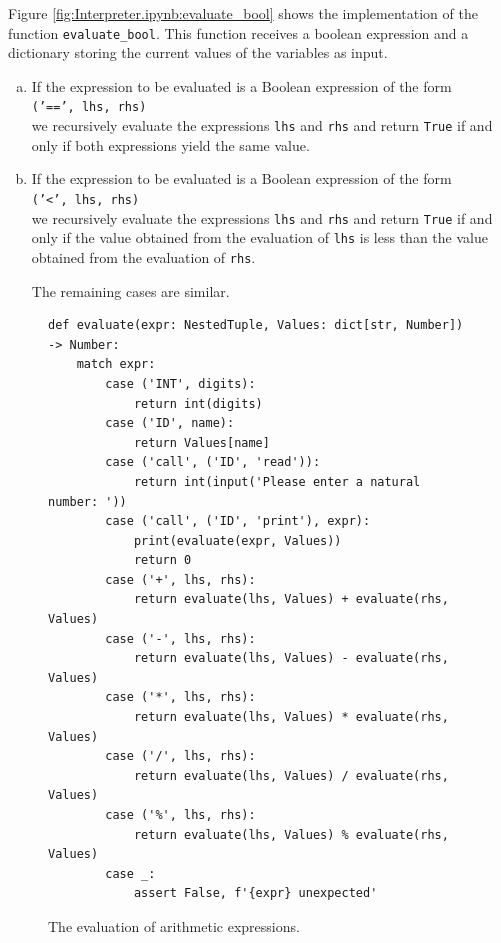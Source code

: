 Figure \ref{fig:Interpreter.ipynb:evaluate_bool} shows the implementation of the function \texttt{evaluate\_bool}.
This function receives a boolean expression and a dictionary storing the current values of the variables as input.
\begin{enumerate}[(a)]
\item If the expression to be evaluated is a Boolean expression of the form
      \\[0.2cm]
      \hspace*{1.3cm}
      \texttt{('==', lhs, rhs)}
      \\[0.2cm]
      we recursively evaluate the expressions \texttt{lhs} and \texttt{rhs} and return \texttt{True} if and only if
      both expressions yield the same value.
\item If the expression to be evaluated is a Boolean expression of the form
      \\[0.2cm]
      \hspace*{1.3cm}
      \texttt{('<', lhs, rhs)}
      \\[0.2cm]
      we recursively evaluate the expressions \texttt{lhs} and \texttt{rhs} and return \texttt{True} if and only if
      the value obtained from the evaluation of \texttt{lhs} is less than the
      value obtained from the evaluation of \texttt{rhs}.

      The remaining cases are similar.
\end{enumerate}

\begin{figure}[!ht]
\centering
\begin{verbatim}
def evaluate(expr: NestedTuple, Values: dict[str, Number]) -> Number:
    match expr:
        case ('INT', digits):
            return int(digits)
        case ('ID', name):
            return Values[name]
        case ('call', ('ID', 'read')):
            return int(input('Please enter a natural number: '))
        case ('call', ('ID', 'print'), expr):
            print(evaluate(expr, Values))
            return 0
        case ('+', lhs, rhs):
            return evaluate(lhs, Values) + evaluate(rhs, Values)
        case ('-', lhs, rhs):
            return evaluate(lhs, Values) - evaluate(rhs, Values)
        case ('*', lhs, rhs):
            return evaluate(lhs, Values) * evaluate(rhs, Values)
        case ('/', lhs, rhs):
            return evaluate(lhs, Values) / evaluate(rhs, Values)
        case ('%', lhs, rhs):
            return evaluate(lhs, Values) % evaluate(rhs, Values)
        case _:
            assert False, f'{expr} unexpected'
\end{verbatim}
\vspace*{-0.3cm}
\caption{The evaluation of arithmetic expressions.}
\label{fig:Interpreter.ipynb:evaluate}
\end{figure}

